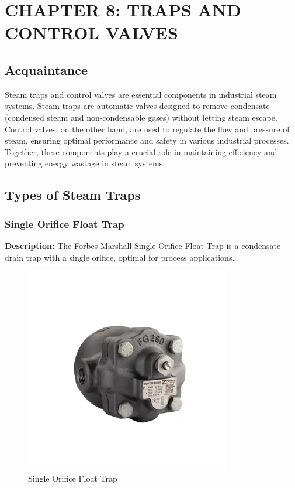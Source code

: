 \section{CHAPTER 8: TRAPS AND CONTROL VALVES}
\subsection{Acquaintance}
Steam traps and control valves are essential components in industrial steam systems. Steam traps are automatic valves designed to remove condensate (condensed steam and non-condensable gases) without letting steam escape. Control valves, on the other hand, are used to regulate the flow and pressure of steam, ensuring optimal performance and safety in various industrial processes. Together, these components play a crucial role in maintaining efficiency and preventing energy wastage in steam systems.

\subsection{Types of Steam Traps}
\subsubsection{Single Orifice Float Trap}

\textbf{Description:} The Forbes Marshall Single Orifice Float Trap is a condensate drain trap with a single orifice, optimal for process applications.
\begin{figure}[h]
    \centering
    \includegraphics[width=0.8\textwidth,height=0.33\textheight,keepaspectratio]{figs/lastmin/Single Orifice Ball Float Trap.png}
    \caption{Single Orifice Float Trap}
    \label{fig:single_orifice_float_trap}
\end{figure}

